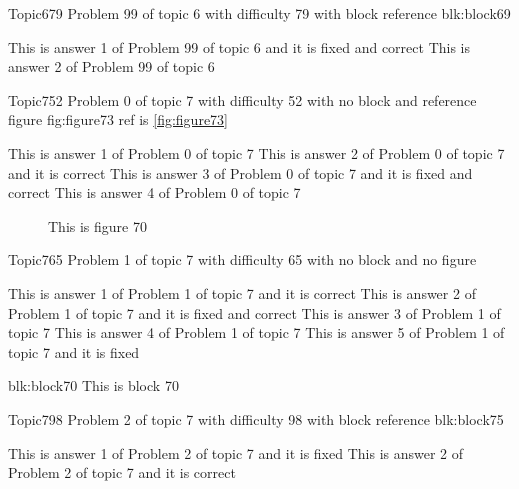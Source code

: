 \documentclass[master]{exam}
\begin{document}
\begin{problem}[requires=blk:block69]{Topic6}{79}
	Problem 99 of topic 6 with difficulty 79 with block reference blk:block69
	\begin{answers}
		 This is answer 1 of Problem 99 of topic 6 and it is fixed and correct
		\answer This is answer 2 of Problem 99 of topic 6 
	\end{answers}
\end{problem}

\begin{problem}{Topic7}{52}
	Problem 0 of topic 7 with difficulty 52 with no block and reference figure fig:figure73 ref is \ref{fig:figure73}
	\begin{answers}
		\answer This is answer 1 of Problem 0 of topic 7 
		\answer[correct] This is answer 2 of Problem 0 of topic 7 and it is correct
		 This is answer 3 of Problem 0 of topic 7 and it is fixed and correct
		\answer This is answer 4 of Problem 0 of topic 7 
	\end{answers}
\end{problem}



\begin{figure}
	\begin{center}
		This is figure 70 
		\label{fig:figure70}
	\end{center}
\end{figure}

\begin{problem}{Topic7}{65}
	Problem 1 of topic 7 with difficulty 65 with no block and no figure
	\begin{answers}
		\answer[correct] This is answer 1 of Problem 1 of topic 7 and it is correct
		 This is answer 2 of Problem 1 of topic 7 and it is fixed and correct
		\answer This is answer 3 of Problem 1 of topic 7 
		\answer This is answer 4 of Problem 1 of topic 7 
		\answer[fixed] This is answer 5 of Problem 1 of topic 7 and it is fixed
	\end{answers}
\end{problem}



\begin{block}{blk:block70}
This is block 70
\end{block}


\begin{problem}[requires=blk:block75]{Topic7}{98}
	Problem 2 of topic 7 with difficulty 98 with block reference blk:block75
	\begin{answers}
		\answer[fixed] This is answer 1 of Problem 2 of topic 7 and it is fixed
		\answer[correct] This is answer 2 of Problem 2 of topic 7 and it is correct
	\end{answers}
\end{problem}
\end{document}
